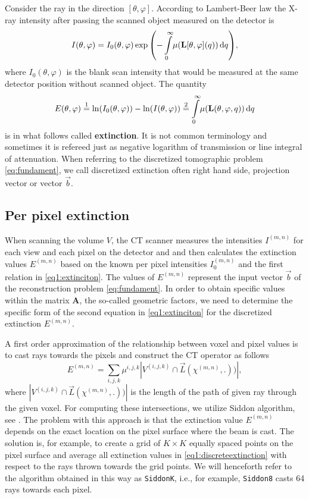 Consider the ray in the direction $[\theta, \varphi]$. According to Lambert-Beer law the X-ray intensity after passing the scanned object measured on the detector is
\begin{equation}
    I(\theta, \varphi) = I_0(\theta, \varphi) \exp{\left(-\int\limits_0^\infty \! \mu(\mathbf{L}[\theta, \varphi]( q)) \, \mathrm{d} q\right)}, \label{eq:lambertbeer}
\end{equation}
where $I_0(\theta, \varphi)$ is the blank scan intensity that would be measured at the same detector position without scanned object. The quantity
\begin{equation}
    E(\theta, \varphi) \stackrel{1}{=} \ln(I_0(\theta, \varphi)) - \ln(I(\theta, \varphi)) \stackrel{2}{=} \int\limits_0^\infty \!  \mu(\mathbf{L}(\theta, \varphi, q)) \, \mathrm{d} q
    \label{eq1:extinciton}
\end{equation}
is in what follows called \textbf{extinction}. It is not common terminology and sometimes it is refereed just as negative logarithm of transmission or line integral of attenuation. When referring to the discretized tomographic problem \eqref{eq:fundament}, we call discretized extinction often right hand side, projection vector or vector $\vec{b}$.

\subsection{Per pixel extinction}
\label{sec:perpixel}
When scanning the volume $V$, the CT scanner measures the intensities $I^{(m,n)}$ for each view and each pixel on the detector and and then calculates the extinction values $E^{(m,n)}$ based on the known per pixel intensities $I_0^{(m,n)}$ and the first relation in \eqref{eq1:extinciton}. The values of $E^{(m,n)}$ represent the input vector $\vec{b}$ of the reconstruction problem \eqref{eq:fundament}. In order to obtain specific values within the matrix $\mathbf{A}$, the so-called geometric factors, we need to determine the specific form of the second equation in \eqref{eq1:extinciton} for the discretized extinction $E^{(m,n)}$.

A first order approximation of the relationship between voxel and pixel values is to cast rays towards the pixels and construct the CT operator as follows
\begin{equation}
    E^{(m,n)} = \sum_{i,j,k} \mu^{i,j,k} |V^{(i,j,k)} \cap \vec{L}(\chi^{(m,n)}, .))|,
    \label{eq1:discreteextinction}
\end{equation}
where $|V^{(i,j,k)} \cap \vec{L}(\chi^{(m,n)}, .))|$ is the length of the path of given ray through the given voxel. For computing these intersections, we utilize Siddon algorithm, see \cite{Siddon1985}. The problem with this approach is that the extinction value $E^{(m,n)}$ depends on the exact location on the pixel surface where the beam is cast. The solution is, for example, to create a grid of $K \times K$ equally spaced points on the pixel surface and average all extinction values in \eqref{eq1:discreteextinction} with respect to the rays thrown towards the grid points. We will henceforth refer to the algorithm obtained in this way as \texttt{SiddonK}, i.e., for example, \texttt{Siddon8} casts 64 rays towards each pixel.

